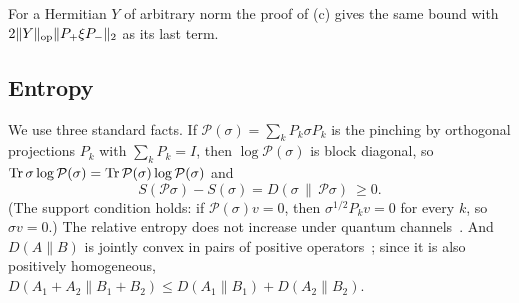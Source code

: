 For a Hermitian $Y$ of arbitrary norm the proof of (c) gives the same bound with $2\lVert Y\rVert_{\mathrm{op}}\lVert P_+\xi P_-\rVert_2$ as its last term.

\subsection{Entropy}\label{state:entropy}

We use three standard facts. If $\mathcal P(\sigma)=\sum_kP_k\sigma P_k$ is the pinching by orthogonal projections $P_k$ with
$\sum_kP_k=I$, then $\log\mathcal P(\sigma)$ is block diagonal, so $\operatorname{Tr}\sigma\log\mathcal P(\sigma)=\operatorname{Tr}\mathcal P(\sigma)\log\mathcal P(\sigma)$
and
\begin{equation}\label{eq:pinching}
S(\mathcal P\sigma)-S(\sigma)=D(\sigma\,\|\,\mathcal P\sigma)\ \ge0 .
\end{equation}
(The support condition holds: if $\mathcal P(\sigma)v=0$, then $\sigma^{1/2}P_kv=0$ for every $k$, so $\sigma v=0$.) The relative entropy
does not increase under quantum channels~\cite{Lin75,Uhl77}. And $D(A\|B)$ is jointly convex in pairs of positive
operators~\cite{Lie73,Lin74}; since it is also positively homogeneous, $D(A_1+A_2\|B_1+B_2)\le D(A_1\|B_1)+D(A_2\|B_2)$.

